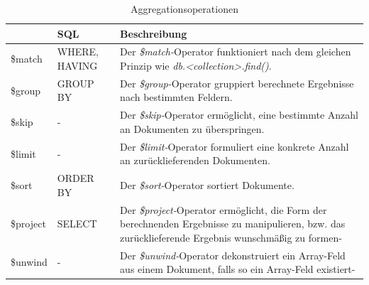 \begin{table}[H]
\centering
\begin{tabular}{lp{2.3cm}p{10.3cm}}
\toprule 
    \rowcolor{gray!50}
	\mongo & SQL & Beschreibung\\
	\midrule
	\$match & WHERE, HAVING & Der \textit{\$match-}Operator funktioniert nach dem gleichen Prinzip wie \textit{db.<collection>.find({})}.\\
	\$group & GROUP BY & Der \textit{\$group-}Operator gruppiert berechnete Ergebnisse nach bestimmten Feldern.\\
	\$skip & - & Der \textit{\$skip-}Operator ermöglicht, eine bestimmte Anzahl an Dokumenten zu überspringen.\\
	\$limit & - & Der \textit{\$limit-}Operator formuliert eine konkrete Anzahl an zurücklieferenden Dokumenten.\\
	\$sort & ORDER BY & Der \textit{\$sort-}Operator sortiert Dokumente.\\
	\$project  & SELECT & Der \textit{\$project-}Operator ermöglicht, die Form der berechnenden Ergebnisse zu manipulieren, bzw. das zurücklieferende Ergebnis wunschmäßig zu formen-\\
	\$unwind  & - & Der \textit{\$unwind-}Operator dekonstruiert ein Array-Feld aus einem Dokument, falls so ein Array-Feld existiert-\\
	\bottomrule
\end{tabular}
\caption[Aggregationsoperationen]{Aggregationsoperationen}
\label{table:aggrOperators}
\end{table}

